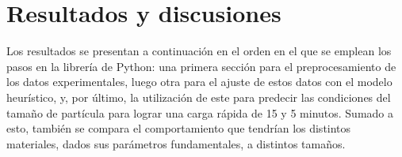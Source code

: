\section{Resultados y discusiones}

Los resultados se presentan a continuación en el orden en el que se emplean 
los pasos en la librería  de Python: una primera sección
para el preprocesamiento de los datos experimentales, luego otra para el ajuste
de estos datos con el modelo heurístico, y, por último, la utilización de este
para predecir las condiciones del tamaño de partícula para lograr una carga
rápida de 15 y 5 minutos. Sumado a esto, también se compara el comportamiento que
tendrían los distintos materiales, dados sus parámetros fundamentales, a 
distintos tamaños.








